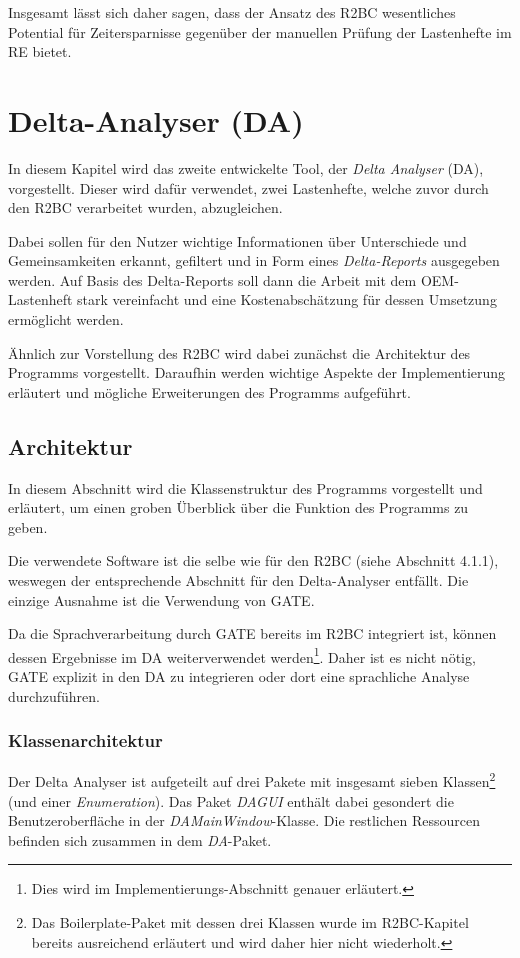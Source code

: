 \documentclass[12pt]{report}
\begin{document}
Insgesamt lässt sich daher sagen, dass der Ansatz des R2BC wesentliches Potential für Zeitersparnisse gegenüber der manuellen Prüfung der Lastenhefte im RE bietet.

\chapter{Delta-Analyser (DA)}
In diesem Kapitel wird das zweite entwickelte Tool, der \textit{Delta Analyser} (DA), vorgestellt. Dieser wird dafür verwendet, zwei Lastenhefte, welche zuvor durch den R2BC verarbeitet wurden, abzugleichen. 

Dabei sollen für den Nutzer wichtige Informationen über Unterschiede und Gemeinsamkeiten erkannt, gefiltert und in Form eines \textit{Delta-Reports} ausgegeben werden. Auf Basis des Delta-Reports soll dann die Arbeit mit dem OEM-Lastenheft stark vereinfacht und eine Kostenabschätzung für dessen Umsetzung ermöglicht werden. 

Ähnlich zur Vorstellung des R2BC wird dabei zunächst die Architektur des Programms vorgestellt. Daraufhin werden wichtige Aspekte der Implementierung erläutert und mögliche Erweiterungen des Programms aufgeführt.
 
\section{Architektur}
In diesem Abschnitt wird die Klassenstruktur des Programms vorgestellt und erläutert, um einen groben Überblick über die Funktion des Programms zu geben. 

Die verwendete Software ist die selbe wie für den R2BC (siehe Abschnitt 4.1.1), weswegen der entsprechende Abschnitt für den Delta-Analyser entfällt. Die einzige Ausnahme ist die Verwendung von GATE. 

Da die Sprachverarbeitung durch GATE bereits im R2BC integriert ist, können dessen Ergebnisse im DA weiterverwendet werden\footnote{Dies wird im Implementierungs-Abschnitt genauer erläutert.}. Daher ist es nicht nötig, GATE explizit in den DA zu integrieren oder dort eine sprachliche Analyse durchzuführen.

\subsection{Klassenarchitektur}
Der Delta Analyser ist aufgeteilt auf drei Pakete mit insgesamt sieben Klassen\footnote{Das Boilerplate-Paket mit dessen drei Klassen wurde im R2BC-Kapitel bereits ausreichend erläutert und wird daher hier nicht wiederholt.} (und einer \textit{Enumeration}). Das Paket \textit{DAGUI} enthält dabei gesondert die Benutzeroberfläche in der \textit{DAMainWindow}-Klasse. Die restlichen Ressourcen befinden sich zusammen in dem \textit{DA}-Paket.
\end{document}
